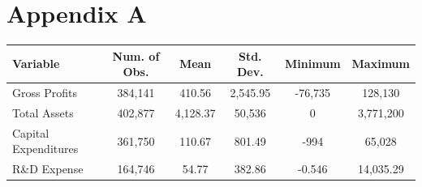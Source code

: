 %
%

\chapter{Appendix A}
\label{app:app01}

\begin{table}[h]
\centering
\begin{tabular}{ l | c | c | c | c | c }
	\hline
	\textbf{Variable} & \textbf{Num. of Obs.} & \textbf{Mean} & \textbf{Std. Dev.} & \textbf{Minimum} & \textbf{Maximum} \\
    \hline \hline
    Gross Profits & 384,141 & 410.56 & 2,545.95 & -76,735 & 128,130 \\
	\hline
    Total Assets & 402,877 & 4,128.37 & 50,536 & 0 & 3,771,200 \\
    \hline
    Capital Expenditures & 361,750 & 110.67 & 801.49 & -994 & 65,028 \\
    \hline
    R\&D Expense & 164,746 & 54.77 & 382.86 & -0.546 & 14,035.29 \\
    \hline \hline
\end{tabular}
\end{table}

